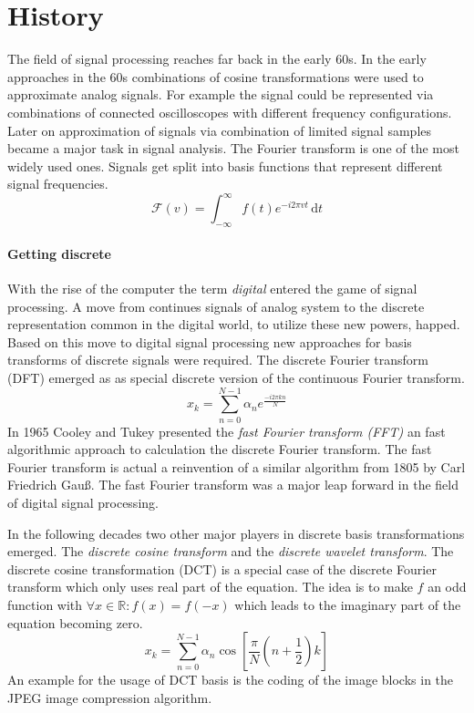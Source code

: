 

\section{History}
\label{sec:history}
The field of signal processing reaches far back in the early 60s.
\cite{Rubinstein2010}
In the early approaches in the 60s combinations of cosine 
transformations were used to approximate analog signals. For example the signal
could be represented via combinations of connected oscilloscopes with different
frequency configurations. Later on approximation of signals via combination of
limited signal samples became a major task in signal analysis.  The Fourier
transform is one of the most widely used ones. Signals get split into basis
functions that represent different signal frequencies.
\begin{equation*}
\mathcal{F}\left(v\right) = \int_{-\infty}^{\infty} \! f(t)e^{-i2\pi vt} \,
\mathrm{d}t
\end{equation*}

\paragraph{Getting discrete}
With the rise of the computer the term \emph{digital} entered the
game of signal processing. A move from continues signals of analog system to the
discrete representation common in the digital world, to utilize these new
powers, happed. Based on this move to digital signal processing new
approaches for basis transforms of discrete signals were required. The discrete
Fourier transform (DFT) emerged as as special discrete version of the continuous
Fourier transform.
\begin{equation*}
 x_k = \sum_{n=0}^{N-1}\alpha_ne^{\frac{-i2\pi kn}{N}}
\end{equation*}
In 1965 Cooley and Tukey presented\cite{Cooley1965} the \emph{fast Fourier
transform (FFT)} an fast algorithmic approach to calculation the discrete
Fourier transform. The fast Fourier transform is actual a reinvention of a
similar algorithm from 1805 by Carl Friedrich Gauß. The fast Fourier transform
was a major leap forward in the field of digital signal processing.

In the following decades two other major players in discrete basis
transformations emerged. The \emph{discrete cosine transform} and the
\emph{discrete wavelet transform}. The discrete cosine transformation (DCT) is a
special case of the discrete Fourier transform which only uses real part of the
equation. The idea is to make $f$ an odd function with $\forall x \in \mathbb{R}
: f(x) = f(-x)$ which leads to the imaginary part of the equation becoming zero.
\begin{equation*}
x_k = \sum_{n=0}^{N-1}\alpha_n\cos \left[ \frac{\pi}{N} \left(
n+\frac{1}{2}\right) k\right]
\end{equation*}
An example for the usage of DCT basis is the coding of the image blocks in the
JPEG image compression algorithm.


